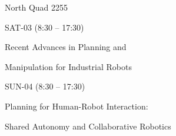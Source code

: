 \documentclass{article}
\begin{document}
\rssheader[2in]

\rssbig
\begin{center}
North Quad 2255
\end{center}

\vfill

\rssmed
\begin{center}
SAT-03 (8:30 -- 17:30)
\end{center}

\rsssm
\begin{center}
Recent Advances in Planning and \par \noindent Manipulation for Industrial Robots
\end{center}

\vfill

\rssmed
\begin{center}
SUN-04 (8:30 -- 17:30)
\end{center}

\rsssm
\begin{center}
Planning for Human-Robot Interaction: \par \noindent Shared Autonomy and Collaborative Robotics
\end{center}

\vfill
\end{document}
